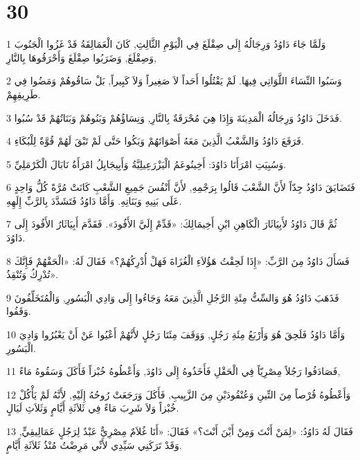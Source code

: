 \chapter{30}

\par 1 وَلَمَّا جَاءَ دَاوُدُ وَرِجَالُهُ إِلَى صِقْلَغَ فِي الْيَوْمِ الثَّالِثِ, كَانَ الْعَمَالِقَةُ قَدْ غَزُوا الْجَنُوبَ وَصِقْلَغَ, وَضَرَبُوا صِقْلَغَ وَأَحْرَقُوهَا بِالنَّارِ,
\par 2 وَسَبُوا النِّسَاءَ اللَّوَاتِي فِيهَا. لَمْ يَقْتُلُوا أَحَداً لاَ صَغِيراً وَلاَ كَبِيراً, بَلْ سَاقُوهُمْ وَمَضُوا فِي طَرِيقِهِمْ.
\par 3 فَدَخَلَ دَاوُدُ وَرِجَالُهُ الْمَدِينَةَ وَإِذَا هِيَ مُحْرَقَةٌ بِالنَّارِ, وَنِسَاؤُهُمْ وَبَنُوهُمْ وَبَنَاتُهُمْ قَدْ سُبُوا.
\par 4 فَرَفَعَ دَاوُدُ وَالشَّعْبُ الَّذِينَ مَعَهُ أَصْوَاتَهُمْ وَبَكُوا حَتَّى لَمْ تَبْقَ لَهُمْ قُوَّةٌ لِلْبُكَاءِ.
\par 5 وَسُبِيَتِ امْرَأَتَا دَاوُدَ: أَخِينُوعَمُ الْيَزْرَعِيلِيَّةُ وَأَبِيجَايِلُ امْرَأَةُ نَابَالَ الْكَرْمَلِيِّ.
\par 6 فَتَضَايَقَ دَاوُدُ جِدّاً لأَنَّ الشَّعْبَ قَالُوا بِرَجْمِهِ, لأَنَّ أَنْفُسَ جَمِيعِ الشَّعْبِ كَانَتْ مُرَّةً كُلُّ وَاحِدٍ عَلَى بَنِيهِ وَبَنَاتِهِ. وَأَمَّا دَاوُدُ فَتَشَدَّدَ بِالرَّبِّ إِلَهِهِ.
\par 7 ثُمَّ قَالَ دَاوُدُ لأَبِيَاثَارَ الْكَاهِنِ ابْنِ أَخِيمَالِكَ: «قَدِّمْ إِلَيَّ الأَفُودَ». فَقَدَّمَ أَبِيَاثَارُ الأَفُودَ إِلَى دَاوُدَ.
\par 8 فَسَأَلَ دَاوُدُ مِنَ الرَّبِّ: «إِذَا لَحِقْتُ هَؤُلاَءِ الْغُزَاةَ فَهَلْ أُدْرِكُهُمْ؟» فَقَالَ لَهُ: «الْحَقْهُمْ فَإِنَّكَ تُدْرِكُ وَتُنْقِذُ».
\par 9 فَذَهَبَ دَاوُدُ هُوَ وَالسِّتُّ مِئَةِ الرَّجُلِ الَّذِينَ مَعَهُ وَجَاءُوا إِلَى وَادِي الْبَسُورِ, وَالْمُتَخَلِّفُونَ وَقَفُوا.
\par 10 وَأَمَّا دَاوُدُ فَلَحِقَ هُوَ وَأَرْبَعُ مِئَةِ رَجُلٍ, وَوَقَفَ مِئَتَا رَجُلٍ لأَنَّهُمْ أَعْيُوا عَنْ أَنْ يَعْبُرُوا وَادِيَ الْبَسُورِ.
\par 11 فَصَادَفُوا رَجُلاً مِصْرِيّاً فِي الْحَقْلِ فَأَخَذُوهُ إِلَى دَاوُدَ, وَأَعْطُوهُ خُبْزاً فَأَكَلَ وَسَقُوهُ مَاءً,
\par 12 وَأَعْطُوهُ قُرْصاً مِنَ التِّينِ وَعُنْقُودَيْنِ مِنَ الزَّبِيبِ, فَأَكَلَ وَرَجَعَتْ رُوحُهُ إِلَيْهِ, لأَنَّهُ لَمْ يَأْكُلْ خُبْزاً وَلاَ شَرِبَ مَاءً فِي ثَلاَثَةِ أَيَّامٍ وَثَلاَثِ لَيَالٍ.
\par 13 فَقَالَ لَهُ دَاوُدُ: «لِمَنْ أَنْتَ وَمِنْ أَيْنَ أَنْتَ؟» فَقَالَ: «أَنَا غُلاَمٌ مِصْرِيٌّ عَبْدٌ لِرَجُلٍ عَمَالِيقِيٍّ, وَقَدْ تَرَكَنِي سَيِّدِي لأَنِّي مَرِضْتُ مُنْذُ ثَلاَثَةِ أَيَّامٍ.
